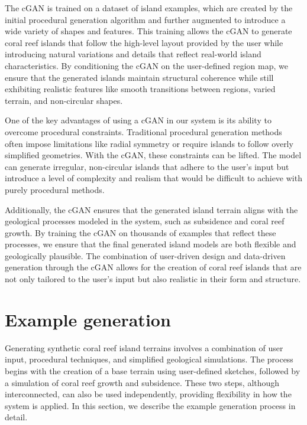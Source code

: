 The cGAN is trained on a dataset of island examples, which are created by the initial procedural generation algorithm and further augmented to introduce a wide variety of shapes and features. This training allows the cGAN to generate coral reef islands that follow the high-level layout provided by the user while introducing natural variations and details that reflect real-world island characteristics. By conditioning the cGAN on the user-defined region map, we ensure that the generated islands maintain structural coherence while still exhibiting realistic features like smooth transitions between regions, varied terrain, and non-circular shapes.

One of the key advantages of using a cGAN in our system is its ability to overcome procedural constraints. Traditional procedural generation methods often impose limitations like radial symmetry or require islands to follow overly simplified geometries. With the cGAN, these constraints can be lifted. The model can generate irregular, non-circular islands that adhere to the user's input but introduce a level of complexity and realism that would be difficult to achieve with purely procedural methods.

Additionally, the cGAN ensures that the generated island terrain aligns with the geological processes modeled in the system, such as subsidence and coral reef growth. By training the cGAN on thousands of examples that reflect these processes, we ensure that the final generated island models are both flexible and geologically plausible. The combination of user-driven design and data-driven generation through the cGAN allows for the creation of coral reef islands that are not only tailored to the user's input but also realistic in their form and structure.


\section{Example generation}
\label{sec:coral-island_example-generation}

Generating synthetic coral reef island terrains involves a combination of user input, procedural techniques, and simplified geological simulations. The process begins with the creation of a base terrain using user-defined sketches, followed by a simulation of coral reef growth and subsidence. These two steps, although interconnected, can also be used independently, providing flexibility in how the system is applied. In this section, we describe the example generation process in detail.

